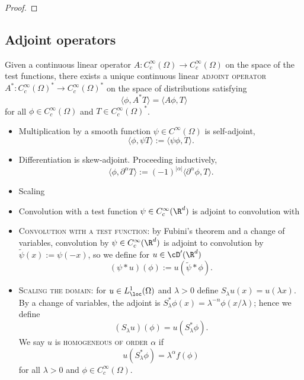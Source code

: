 \documentclass[reqno]{amsart}
\theoremstyle{definition}
\theoremstyle{remark}
\renewcommand{\emph}{\textsc}
\begin{document}
\begin{proof}
	
\end{proof}
	
\subsection{Adjoint operators}

Given a continuous linear operator $A : C^\infty_c (\Omega) \to C^\infty_c (\Omega)$ on the space of the test functions, there exists a unique continuous linear \emph{adjoint operator} $A^*: C^\infty_c (\Omega)^* \to C^\infty_c (\Omega)^*$ on the space of distributions satisfying
	\[ \langle \phi, A^* T \rangle = \langle A \phi, T \rangle \]
for all $\phi \in C^\infty_c (\Omega)$ and $T \in C^\infty_c (\Omega)^*$. 
\begin{itemize}
	\item Multiplication by a smooth function $\psi \in C^\infty (\Omega)$ is self-adjoint, 
		\[ \langle \phi, \psi T \rangle := \langle \psi \phi , T \rangle. \]
	
	\item Differentiation is skew-adjoint. Proceeding inductively, 
		\[ \langle \phi, \partial^\alpha T \rangle := (-1)^{|\alpha|} \langle \partial^\alpha \phi, T \rangle. \]
	
	\item Scaling

	
	\item Convolution with a test function $\psi \in C^\infty_c (\R^d)$ is adjoint to convolution with
		\[  \]
	
	\item \emph{Convolution with a test function:} by Fubini's theorem and a change of variables, convolution by $\psi \in C^\infty_c (\R^d)$ is adjoint to convolution by $\tilde \psi (x) := \psi(-x)$, so we define for $u \in \cD' (\R^d)$
				\[ (\psi * u)(\phi) := u(\tilde \psi * \phi). \]
	
	\item \emph{Scaling the domain:} for $u \in L^1_\loc (\Omega)$ and $\lambda > 0$ define $S_\lambda u (x) = u(\lambda x)$. By a change of variables, the adjoint is $S_\lambda^* \phi (x) = \lambda^{-n} \phi(x/\lambda)$; hence we define
				\[ (S_\lambda u) (\phi) = u (S^*_\lambda \phi).\]
			We say $u$ is \emph{homogeneous of order $\alpha$} if 
				\[ u(S^*_\lambda \phi) = \lambda^\alpha f(\phi) \]
			for all $\lambda > 0$ and $\phi \in C^\infty_c (\Omega)$. 		
\end{itemize}
\end{document}
